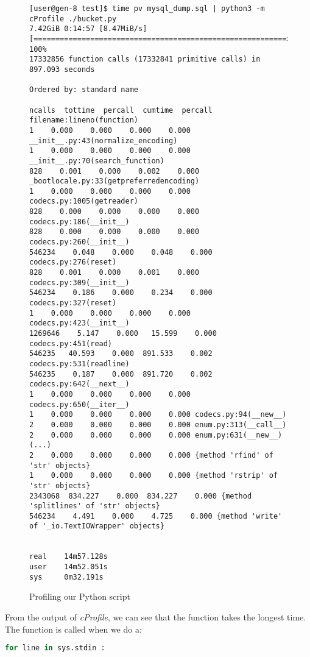 \begin{figure}[h]
	\caption{Profiling our Python script}
\begin{lstlisting}[basicstyle=\fontsize{7}{7}\selectfont\ttfamily,keywordstyle=\itshape\color{red},otherkeywords={891.720,891.533,834.227}]
[user@gen-8 test]$ time pv mysql_dump.sql | python3 -m cProfile ./bucket.py
7.42GiB 0:14:57 [8.47MiB/s] [==========================================================>] 100%            
17332856 function calls (17332841 primitive calls) in 897.093 seconds

Ordered by: standard name

ncalls  tottime  percall  cumtime  percall filename:lineno(function)
1    0.000    0.000    0.000    0.000 __init__.py:43(normalize_encoding)
1    0.000    0.000    0.000    0.000 __init__.py:70(search_function)
828    0.001    0.000    0.002    0.000 _bootlocale.py:33(getpreferredencoding)
1    0.000    0.000    0.000    0.000 codecs.py:1005(getreader)
828    0.000    0.000    0.000    0.000 codecs.py:186(__init__)
828    0.000    0.000    0.000    0.000 codecs.py:260(__init__)
546234    0.048    0.000    0.048    0.000 codecs.py:276(reset)
828    0.001    0.000    0.001    0.000 codecs.py:309(__init__)
546234    0.186    0.000    0.234    0.000 codecs.py:327(reset)
1    0.000    0.000    0.000    0.000 codecs.py:423(__init__)
1269646    5.147    0.000   15.599    0.000 codecs.py:451(read)
546235   40.593    0.000  891.533    0.002 codecs.py:531(readline)
546235    0.187    0.000  891.720    0.002 codecs.py:642(__next__)
1    0.000    0.000    0.000    0.000 codecs.py:650(__iter__)
1    0.000    0.000    0.000    0.000 codecs.py:94(__new__)
2    0.000    0.000    0.000    0.000 enum.py:313(__call__)
2    0.000    0.000    0.000    0.000 enum.py:631(__new__)
(...)
2    0.000    0.000    0.000    0.000 {method 'rfind' of 'str' objects}
1    0.000    0.000    0.000    0.000 {method 'rstrip' of 'str' objects}
2343068  834.227    0.000  834.227    0.000 {method 'splitlines' of 'str' objects}
546234    4.491    0.000    4.725    0.000 {method 'write' of '_io.TextIOWrapper' objects}


real	14m57.128s
user	14m52.051s
sys 	0m32.191s
\end{lstlisting}
\end{figure}


From the output of \emph{cProfile}, we can see that the  function takes the longest time. \\

The  function is called when we do a:
\begin{lstlisting}[language=python]
for line in sys.stdin :
\end{lstlisting}


